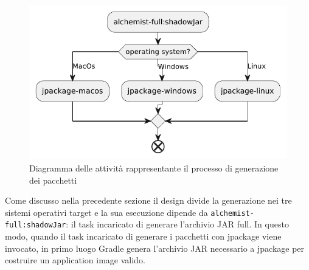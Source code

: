\begin{figure}[htb]
	\centering
	\includegraphics[width=.8\linewidth]{figures/gradle-jpackage-scheme.pdf}
	\caption{Diagramma delle attività rappresentante il processo di generazione dei pacchetti}
	\label{fig:gradle-jpackage-scheme}
\end{figure}
\noindent Come discusso nella precedente sezione il design divide la generazione nei tre sistemi operativi target e la sua esecuzione dipende da \texttt{al\-che\-mi\-st\--fu\-ll\-:sha\-dow\-Jar\-}: il task incaricato di generare l'archivio JAR full. In questo modo, quando il task incaricato di generare i pacchetti con jpackage viene invocato, in primo luogo Gradle genera l'archivio JAR necessario a jpackage per costruire un application image valido.

